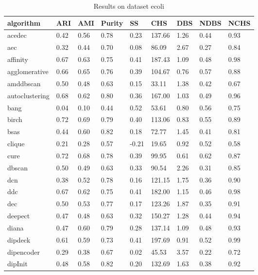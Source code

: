 \begin{table}[H]
\centering
\caption{Results on dataset ecoli}
\label{tab:params:ecoli}
\begin{tabular}{|l|l|l|l|l|l|l|l|l|}
\hline
algorithm & ARI & AMI & Purity & SS & CHS & DBS & NDBS & NCHS \\
\hline
acedec & 0.42 & 0.56 & 0.78 & 0.23 & 137.66 & 1.26 & 0.44 & 0.93 \\
\hline
aec & 0.32 & 0.44 & 0.70 & 0.08 & 86.09 & 2.67 & 0.27 & 0.84 \\
\hline
affinity & 0.67 & 0.63 & 0.75 & 0.41 & 187.43 & 1.09 & 0.48 & 0.98 \\
\hline
agglomerative & 0.66 & 0.65 & 0.76 & 0.39 & 104.67 & 0.76 & 0.57 & 0.88 \\
\hline
amddbscan & 0.50 & 0.48 & 0.63 & 0.15 & 33.11 & 1.38 & 0.42 & 0.67 \\
\hline
autoclustering & 0.68 & 0.62 & 0.80 & 0.36 & 167.00 & 1.03 & 0.49 & 0.96 \\
\hline
bang & 0.04 & 0.10 & 0.44 & 0.52 & 53.61 & 0.80 & 0.56 & 0.75 \\
\hline
birch & 0.72 & 0.69 & 0.79 & 0.40 & 113.06 & 0.83 & 0.55 & 0.89 \\
\hline
bsas & 0.44 & 0.60 & 0.82 & 0.18 & 72.77 & 1.45 & 0.41 & 0.81 \\
\hline
clique & 0.21 & 0.28 & 0.57 & -0.21 & 19.65 & 0.92 & 0.52 & 0.58 \\
\hline
cure & 0.72 & 0.68 & 0.78 & 0.39 & 99.95 & 0.61 & 0.62 & 0.87 \\
\hline
dbscan & 0.50 & 0.49 & 0.63 & 0.33 & 90.54 & 2.26 & 0.31 & 0.85 \\
\hline
dcn & 0.38 & 0.52 & 0.78 & 0.16 & 121.15 & 1.75 & 0.36 & 0.90 \\
\hline
ddc & 0.67 & 0.62 & 0.75 & 0.41 & 182.00 & 1.15 & 0.46 & 0.98 \\
\hline
dec & 0.50 & 0.53 & 0.77 & 0.17 & 123.26 & 1.87 & 0.35 & 0.91 \\
\hline
deepect & 0.47 & 0.48 & 0.63 & 0.32 & 150.27 & 1.28 & 0.44 & 0.94 \\
\hline
diana & 0.47 & 0.60 & 0.79 & 0.28 & 137.14 & 1.09 & 0.48 & 0.93 \\
\hline
dipdeck & 0.61 & 0.59 & 0.73 & 0.41 & 197.69 & 0.91 & 0.52 & 0.99 \\
\hline
dipencoder & 0.29 & 0.38 & 0.67 & 0.02 & 45.53 & 3.57 & 0.22 & 0.72 \\
\hline
dipInit & 0.48 & 0.58 & 0.82 & 0.20 & 132.69 & 1.63 & 0.38 & 0.92 \\

\end{tabular}
\end{table}
